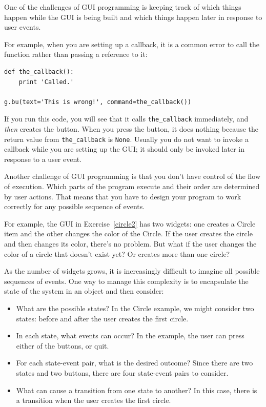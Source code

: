 \documentclass[10pt]{book}
\begin{document}
One of the challenges of GUI programming is keeping track of
which things happen while the GUI is being built and which
things happen later in response to user events.

For example, when you are setting up a callback, it is a common error
to call the function rather than passing a reference to it:

\begin{verbatim}
def the_callback():
    print 'Called.'

g.bu(text='This is wrong!', command=the_callback())
\end{verbatim}
%
If you run this code, you will see that it calls \verb"the_callback"
immediately, and {\em then} creates the button.  When you press the
button, it does nothing because the return value from 
\verb"the_callback" is {\tt None}.
Usually you do not want to invoke a callback while you are
setting up the GUI; it should only be invoked later in response to
a user event.

Another challenge of GUI programming is that you don't have control
of the flow of execution.  Which parts of the program execute
and their order are determined by user actions.
That means that you have to design your program to work correctly
for any possible sequence of events.

For example, the GUI in Exercise~\ref{circle2} has two widgets:
one creates a Circle item and the other changes the color of the
Circle.  If the user creates the circle and then changes its color,
there's no problem.  But what if the user changes the color of
a circle that doesn't exist yet?  Or creates more than one circle?

As the number of widgets grows, it is increasingly difficult to
imagine all possible sequences of events.  One way to manage this 
complexity is to encapsulate the state of the system in an object
and then consider:

\begin{itemize}

\item What are the possible states?  In the Circle example, we
might consider two states: before and after the user creates the
first circle.

\item In each state, what events can occur?  In the example,
the user can press either of the buttons, or quit.

\item For each state-event pair, what is the desired outcome?
Since there are two states and two buttons, there are four
state-event pairs to consider.

\item What can cause a transition from one state to another?
In this case, there is a transition when the user creates
the first circle.

\end{itemize}
\end{document}
